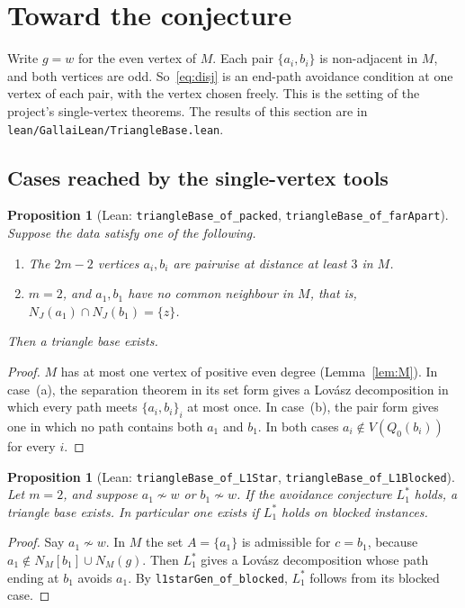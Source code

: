 \documentclass[11pt]{amsart}
\newtheorem{proposition}[theorem]{Proposition}
\theoremstyle{definition}
\begin{document}
\section{Toward the conjecture}\label{sec:toward}

Write $g=w$ for the even vertex of $M$. Each pair $\{a_i,b_i\}$ is non-adjacent in $M$, and both
vertices are odd. So~\eqref{eq:disj} is an end-path avoidance condition at one vertex of each pair,
with the vertex chosen freely. This is the setting of the project's single-vertex theorems. The
results of this section are in \texttt{lean/GallaiLean/TriangleBase.lean}.

\subsection{Cases reached by the single-vertex tools}

\begin{proposition}[Lean: \texttt{triangleBase\_of\_packed}, \texttt{triangleBase\_of\_farApart}]
\label{prop:packed}
Suppose the data satisfy one of the following.
\begin{enumerate}[label=(\alph*)]
\item The $2m-2$ vertices $a_i,b_i$ are pairwise at distance at least $3$ in $M$.
\item $m=2$, and $a_1,b_1$ have no common neighbour in $M$, that is,
$N_J(a_1)\cap N_J(b_1)=\{z\}$.
\end{enumerate}
Then a triangle base exists.
\end{proposition}

\begin{proof}
$M$ has at most one vertex of positive even degree (Lemma~\ref{lem:M}). In case~(a), the separation
theorem in its set form gives a Lov\'asz decomposition in which every path meets $\{a_i,b_i\}_i$ at
most once. In case~(b), the pair form gives one in which no path contains both $a_1$ and $b_1$. In both
cases $a_i\notin V(Q_0(b_i))$ for every $i$.
\end{proof}

\begin{proposition}[Lean: \texttt{triangleBase\_of\_L1Star}, \texttt{triangleBase\_of\_L1Blocked}]
\label{prop:l1star}
Let $m=2$, and suppose $a_1\not\sim w$ or $b_1\not\sim w$. If the avoidance conjecture $L_1^*$ holds,
a triangle base exists. In particular one exists if $L_1^*$ holds on blocked instances.
\end{proposition}

\begin{proof}
Say $a_1\not\sim w$. In $M$ the set $A=\{a_1\}$ is admissible for $c=b_1$, because
$a_1\notin N_M[b_1]\cup N_M(g)$. Then $L_1^*$ gives a Lov\'asz decomposition whose path ending at $b_1$
avoids $a_1$. By \texttt{l1starGen\_of\_blocked}, $L_1^*$ follows from its blocked case.
\end{proof}
\end{document}
